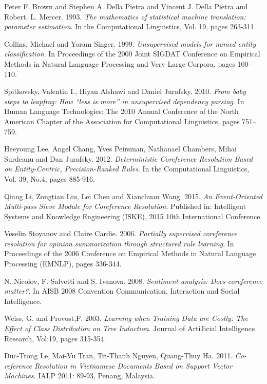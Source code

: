 \documentclass[12pt]{report}
\begin{document}
\begin{thebibliography}{30}
	Peter F. Brown and Stephen A. Della Pietra and Vincent J. Della Pietra and Robert. L. Mercer. 1993.
	\textit{The mathematics of statistical machine translation: parameter estimation}.
	In the Computational Linguistics,  Vol. 19, pages 263-311.

	Collins, Michael and Yoram Singer. 1999.
	\textit{Unsupervised models for named entity classification}.
	In Proceedings of the 2000 Joint SIGDAT Conference on Empirical Methods in Natural Language Processing and Very Large Corpora, pages 100–110.

	Spitkovsky, Valentin I., Hiyan Alshawi and Daniel Jurafsky. 2010.
	\textit{From baby steps to leapfrog: How “less is more” in unsupervised dependency parsing}.
	In Human Language Technologies: The 2010 Annual Conference of the North American Chapter of the Association for Computational Linguistics, pages 751–759.

	Heeyoung Lee, Angel Chang, Yves Peirsman, Nathanael Chambers, Mihai Surdeanu and Dan Jurafsky. 2012.
	\textit{Deterministic Coreference Resolution Based on Entity-Centric, Precision-Ranked Rules}.
	In the Computational Linguistics,  Vol. 39, No.4, pages 885-916.

	Qiang Li, Zongtian Liu, Lei Chen and Xianchuan Wang. 2015.
	\textit{An Event-Oriented Multi-pass Sieve Module for Coreference Resolution}.
	Published in: Intelligent Systems and Knowledge Engineering (ISKE), 2015 10th International Conference.

	Veselin Stoyanov and Claire Cardie. 2006.
	\textit{Partially supervised coreference resolution for opinion summarization through structured rule learning}.
	In Proceedings of the 2006 Conference on Empirical Methods in Natural Language
	Processing (EMNLP), pages 336-344.

	N. Nicolov, F. Salvetti and S. Ivanova. 2008.
	\textit{Sentiment analysis: Does coreference matter?}.
	In AISB 2008 Convention Communication, Interaction and Social Intelligence.	

	Weiss, G. and Provost,F. 2003.
	\textit{Learning when Training Data are Costly: The Effect of Class Distribution on Tree Induction}.
	Journal of ArtiJicial Intelligence Research, Vol:19, pages 315-354.

	Duc-Trong Le, Mai-Vu Tran, Tri-Thanh Nguyen, Quang-Thuy Ha. 2011.
	\textit{Co-reference Resolution in Vietnamese Documents Based on Support Vector Machines}.
	IALP 2011: 89-93, Penang, Malaysia.


\end{thebibliography}
\end{document}
